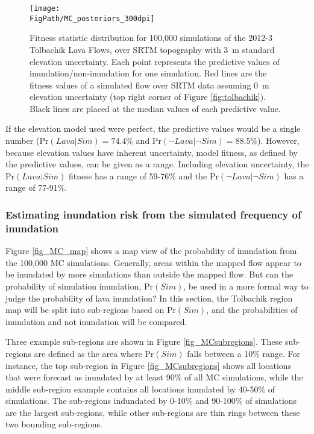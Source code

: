 		\begin{figure}[h!]
			\centering
			\texttt{[image: \\FigPath/MC\_posteriors\_300dpi]}
			\caption[Fitness statistic distribution of Monte Carlo simulations of the 2012-3 Tolbachik lava flows]{Fitness statistic distribution for 100,000 simulations of the 2012-3 Tolbachik Lava Flows, over SRTM topography with 3~m standard elevation uncertainty. Each point represents the predictive values of inundation/non-inundation for one simulation. Red lines are the fitness values of a simulated flow over SRTM data assuming 0~m elevation uncertainty (top right corner of Figure \ref{fig:tolbachik}). Black lines are placed at the median values of each predictive value.}
			\label{fig:MC_dist}
		\end{figure}
			
			If the elevation model used were perfect, the predictive values would be a single number ($\text{Pr}(Lava|Sim)=74.4$\% and $\text{Pr}(\neg Lava|\neg Sim)=88.5$\%). However, because elevation values have inherent uncertainty, model fitness, as defined by the predictive values, can be given as a range. Including elevation uncertainty, the $\text{Pr}(Lava|Sim)$ fitness has a range of 59-76\% and the $\text{Pr}(\neg Lava|\neg Sim)$ has a range of 77-91\%.


		\subsubsection{Estimating inundation risk from the simulated frequency of inundation}
		Figure \ref{fig_MC_map} shows a map view of the probability of inundation from the 100,000 MC simulations. Generally, areas within the mapped flow appear to be inundated by more simulations than outside the mapped flow. But can the probability of simulation inundation, $\text{Pr}(Sim)$, be used in a more formal way to judge the probability of lava inundation? In this section, the Tolbachik region map will be split into sub-regions based on $\text{Pr}(Sim)$, and the probabilities of inundation and not inundation will be compared.
		
		Three example sub-regions are shown in Figure \ref{fig_MCsubregions}. These sub-regions are defined as the area where $\text{Pr}(Sim)$ falls between a 10\% range. For instance, the top sub-region in Figure \ref{fig_MCsubregions} shows all locations that were forecast as inundated by at least 90\% of all MC simulations, while the middle sub-region example contains all locations inundated by 40-50\% of simulations. The sub-regions indundated by 0-10\% and 90-100\% of simulations are the largest sub-regions, while other sub-regions are thin rings between these two bounding sub-regions.
		
